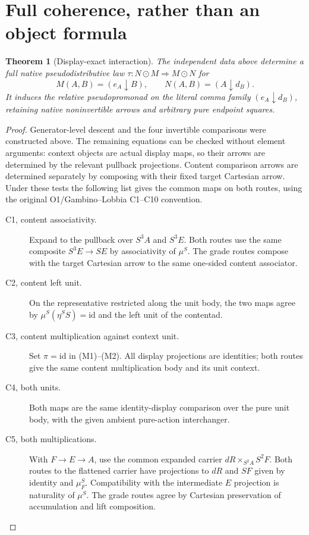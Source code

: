 \documentclass[11pt]{article}
\newtheorem{theorem}{Theorem}\newtheorem{lemma}{Lemma}
\begin{document}
\section{Full coherence, rather than an object formula}
\begin{theorem}[Display-exact interaction]
The independent data above determine a full native pseudodistributive law
$\tau:N\odot M\Rightarrow M\odot N$ for
\[
 M(A,B)=(e_A\downarrow B),\qquad N(A,B)=(A\downarrow d_B).
\]
It induces the relative pseudopromonad on the literal comma family $(e_A\downarrow d_B)$, retaining native noninvertible arrows and arbitrary pure endpoint squares.
\end{theorem}
\begin{proof}
Generator-level descent and the four invertible comparisons were constructed above. The remaining equations can be checked without element arguments: context objects are actual display maps, so their arrows are determined by the relevant pullback projections. Content comparison arrows are determined separately by composing with their fixed target Cartesian arrow. Under these tests the following list gives the common maps on both routes, using the original O1/Gambino--Lobbia C1--C10 convention.
\begin{description}
\item[C1, content associativity.] Expand to the pullback over $S^3A$ and $S^3E$. Both routes use the same composite $S^3E\to SE$ by associativity of $\mu^S$. The grade routes compose with the target Cartesian arrow to the same one-sided content associator.
\item[C2, content left unit.] On the representative restricted along the unit body, the two maps agree by $\mu^S(\eta^SS)=\mathrm{id}$ and the left unit of the contentad.
\item[C3, content multiplication against context unit.] Set $\pi=\mathrm{id}$ in (M1)--(M2). All display projections are identities; both routes give the same content multiplication body and its unit context.
\item[C4, both units.] Both maps are the same identity-display comparison over the pure unit body, with the given ambient pure-action interchanger.
\item[C5, both multiplications.] With $F\to E\to A$, use the common expanded carrier $dR\times_{S^2A}S^2F$. Both routes to the flattened carrier have projections to $dR$ and $SF$ given by identity and $\mu^S_F$. Compatibility with the intermediate $E$ projection is naturality of $\mu^S$. The grade routes agree by Cartesian preservation of accumulation and lift composition.

\end{description}
\end{proof}
\end{document}

